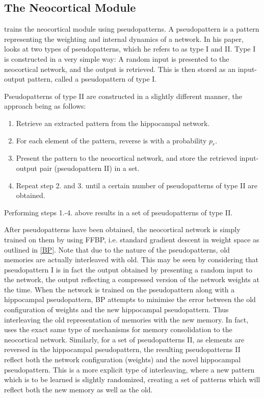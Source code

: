 \subsection{The Neocortical Module}

\cite{Hattori2010} trains the neocortical module using pseudopatterns. A pseudopattern is a pattern representing the weighting and internal dynamics of a network. In his paper, \cite{Hattori2010} looks at two types of pseudopatterns, which he refers to as type I and II. Type I is constructed in a very simple way: A random input is presented to the neocortical network, and the output is retrieved. This is then stored as an input-output pattern, called a pseudopattern of type I.

Pseudopatterns of type II are constructed in a slightly different manner, the approach being as follows:

\begin{enumerate}
\item Retrieve an extracted pattern from the hippocampal network.
\item For each element of the pattern, reverse is with a probability $p_r$.
\item Present the pattern to the neocortical network, and store the retrieved input-output pair (pseudopattern II) in a set.
\item Repeat step 2. and 3. until a certain number of pseudopatterns of type II are obtained.
\end{enumerate}
Performing steps 1.-4. above results in a set of pseudopatterns of type II.

After pseudopatterns have been obtained, the neocortical network is simply trained on them by using FFBP, i.e. standard gradient descent in weight space as outlined in \ref{BP}. Note that due to the nature of the pseudopatterns, old memories are actually interleaved with old. This may be seen by considering that pseudopattern I is in fact the output obtained by presenting a random input to the network, the output reflecting a compressed version of the network weights at the time. When the network is trained on the pseudopattern along with a hippocampal pseudopattern, BP attempts to minimise the error between the old configuration of weights and the new hippocampal pseudopattern. Thus interleaving the old representation of memories with the new memory. In fact, \cite{Hattori2014} uses the exact same type of mechanisms for memory consolidation to the neocortical network.
Similarly, for a set of pseudopatterns II, as elements are reversed in the hippocampal pseudopattern, the resulting pseudopatterns II reflect both the network configuration (weights) and the novel hippocampal pseudopattern. This is a more explicit type of interleaving, where a new pattern which is to be learned is slightly randomized, creating a set of patterns which will reflect both the new memory as well as the old.

